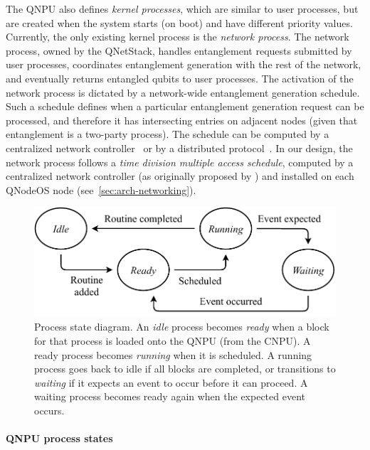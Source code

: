The \ac{QNPU} also defines \emph{kernel processes}, which are similar to user processes, but are created when the system starts (on boot) and have different priority values. Currently, the only existing kernel process is the \emph{network process}. The network process, owned by the \ac{QNetStack}, handles entanglement requests submitted by user processes, coordinates entanglement generation with the rest of the network, and eventually returns entangled qubits to user processes. The activation of the network process is dictated by a network-wide entanglement generation schedule. Such a schedule defines when a particular entanglement generation request can be processed, and therefore it has intersecting entries on adjacent nodes (given that entanglement is a two-party process). The schedule can be computed by a centralized network controller~\cite{skrzypczyk_2021_arch} or by a distributed protocol~\cite{dahlberg_2019_egp}. In our design, the network process follows a \emph{time division multiple access schedule}, computed by a centralized network controller (as originally proposed by \textcite{skrzypczyk_2021_arch}) and installed on each \ac{QNodeOS} node (see~\cref{sec:arch-networking}).

\begin{figure}
\begin{center}
\includegraphics[width=\linewidth]{figures/qnodeos/supplementary/process-states.pdf}
\end{center}
\caption[]{Process state diagram. An \emph{idle} process becomes \emph{ready} when a block for that process is loaded onto the \ac{QNPU} (from the \ac{CNPU}). A ready process becomes \emph{running} when it is scheduled. A running process goes back to idle if all blocks are completed, or transitions to \emph{waiting} if it expects an event to occur before it can proceed. A waiting process becomes ready again when the expected event occurs.}
\label{fig:process-states}
\end{figure}

\paragraph{QNPU process states}

